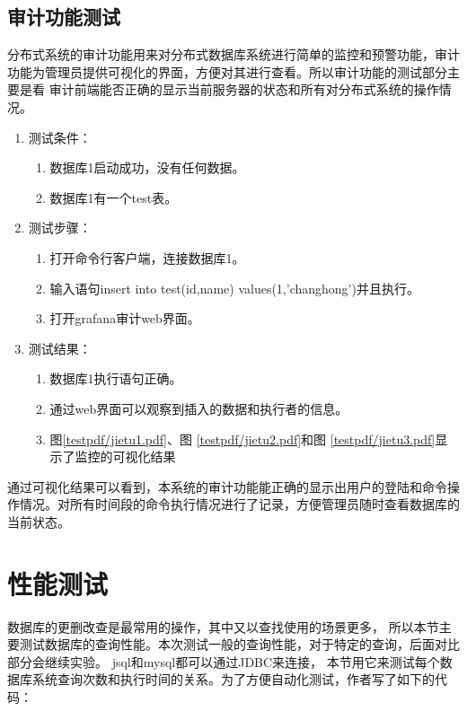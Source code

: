 \subsection{审计功能测试}
分布式系统的审计功能用来对分布式数据库系统进行简单的监控和预警功能，审计功能为管理员提供可视化的界面，方便对其进行查看。所以审计功能的测试部分主要是看
审计前端能否正确的显示当前服务器的状态和所有对分布式系统的操作情况。
\begin{enumerate}
	\item 测试条件：
	\begin{enumerate}
		\item 数据库1启动成功，没有任何数据。
		\item 数据库1有一个test表。
	\end{enumerate}
	\item 测试步骤：
	\begin{enumerate}
		\item 打开命令行客户端，连接数据库1。
		\item 输入语句insert into test(id,name) values(1,'changhong')并且执行。
		\item 打开grafana审计web界面。
	\end{enumerate}
	\item 	测试结果：
	\begin{enumerate}
		\item 数据库1执行语句正确。
		\item 通过web界面可以观察到插入的数据和执行者的信息。
		\item 图\ref{testpdf/jietu1.pdf}、图
		\ref{testpdf/jietu2.pdf}和图
		\ref{testpdf/jietu3.pdf}显示了监控的可视化结果
	\end{enumerate}
\end{enumerate}	

 
 通过可视化结果可以看到，本系统的审计功能能正确的显示出用户的登陆和命令操作情况。对所有时间段的命令执行情况进行了记录，方便管理员随时查看数据库的当前状态。
\section{性能测试}
数据库的更删改查是最常用的操作，其中又以查找使用的场景更多，
所以本节主要测试数据库的查询性能。本次测试一般的查询性能，对于特定的查询，后面对比部分会继续实验。
jsql和mysql都可以通过JDBC来连接，
本节用它来测试每个数据库系统查询次数和执行时间的关系。为了方便自动化测试，作者写了如下的代码：

